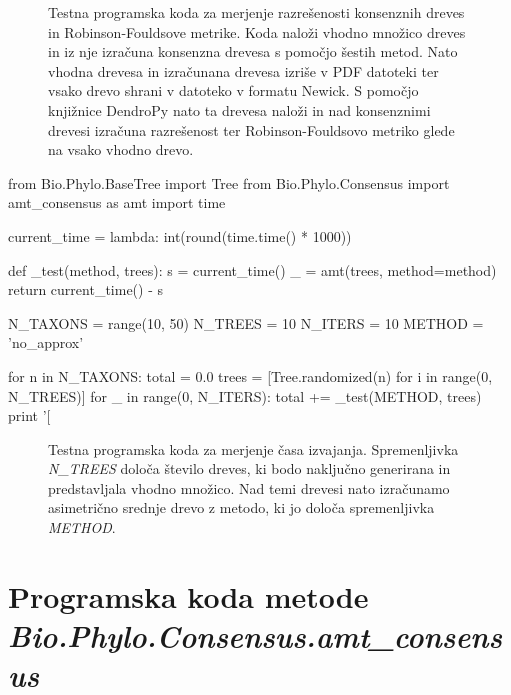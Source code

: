 \documentclass[a4paper, 12pt]{book}
\begin{document}
\begin{figure}[h!]
	\label{app-code-metrics}
	\footnotesize
	{
	\caption{
		Testna programska koda za merjenje razrešenosti konsenznih dreves 
		in Robinson-Fouldsove metrike. Koda naloži vhodno množico dreves 
		in iz nje izračuna konsenzna drevesa s pomočjo šestih metod. 
		Nato vhodna drevesa in izračunana drevesa izriše v PDF datoteki 
		ter vsako drevo shrani v datoteko v formatu Newick. S pomočjo 
		knjižnice DendroPy nato ta drevesa naloži in nad konsenznimi drevesi 
		izračuna razrešenost ter Robinson-Fouldsovo metriko glede na 
		vsako vhodno drevo.
	}
	}
\end{figure}
\clearpage
\begin{python}
from Bio.Phylo.BaseTree import Tree
from Bio.Phylo.Consensus import amt_consensus as amt
import time

current_time = lambda: int(round(time.time() * 1000))


def _test(method, trees):
    s = current_time()
    _ = amt(trees, method=method)
    return current_time() - s

N_TAXONS = range(10, 50)
N_TREES = 10
N_ITERS = 10
METHOD = 'no_approx'

for n in N_TAXONS:
    total = 0.0
    trees = [Tree.randomized(n) for i in range(0, N_TREES)]
    for _ in range(0, N_ITERS):
        total += _test(METHOD, trees)
    print '[%
\end{python}
\begin{figure}[h!]
	\label{app-code-time}
	\footnotesize
	{
	\caption{
		Testna programska koda za merjenje časa izvajanja. Spremenljivka 
		{\it N\_TREES} določa število dreves, ki bodo naključno generirana 
		in predstavljala vhodno množico. Nad temi drevesi nato izračunamo 
		asimetrično srednje drevo z metodo, ki jo določa spremenljivka {\it METHOD}.  
	}
	}
\end{figure}

\chapter{Programska koda metode {\it Bio.Phylo.Consensus.amt\_consensus}\label{appendix-code-amt_consensus}}
\end{document}
